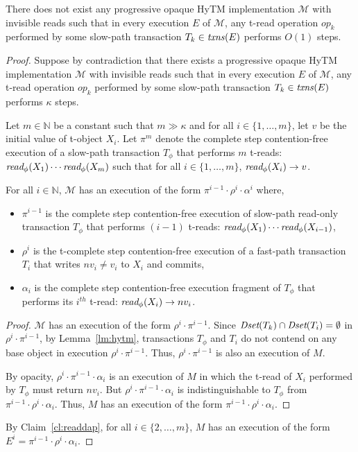 %
\begin{theorem}
\label{th:impossibility}
There does not exist any progressive opaque HyTM implementation $\mathcal{M}$ with invisible reads such that in every execution $E$ of $\mathcal{M}$, any t-read operation $op_k$ performed by some slow-path transaction $T_k \in \ms{txns}(E)$
performs $O(1)$ steps.
\end{theorem}
%
\begin{proof}
Suppose by contradiction that there exists a progressive opaque HyTM implementation $\mathcal{M}$ with invisible reads such that in every execution $E$ of $\mathcal{M}$, any t-read operation $op_k$ performed by some slow-path transaction $T_k \in \ms{txns}(E)$
performs $\kappa$ steps.

Let $m \in \mathbb{N}$ be a constant such that $m \gg \kappa$ and for all $i\in \{1,\ldots , m\}$, let $v$ be the initial value of t-object $X_i$.
Let $\pi^{m}$ denote the complete step contention-free execution of a slow-path transaction
$T_{\phi}$ that performs ${m}$ t-reads: $\textit{read}_{\phi}(X_1)\cdots \textit{read}_{\phi}(X_{m})$
such that for all $i\in \{1,\ldots , m \}$, $\textit{read}_{\phi}(X_i) \rightarrow v$.
%
\begin{claim}
\label{cl:readdap}
For all $i\in \mathbb{N}$, $\mathcal{M}$ has an execution of the form $\pi^{i-1}\cdot \rho^i\cdot \alpha^i$ where,
%
\begin{itemize}
\item
$\pi^{i-1}$ is the complete step contention-free execution of slow-path read-only transaction $T_{\phi}$ that performs
$(i-1)$ t-reads: $\textit{read}_{\phi}(X_1)\cdots \textit{read}_{\phi}(X_{i-1})$,
\item
$\rho^i$ is the t-complete step contention-free execution of a fast-path transaction $T_{i}$
that writes $nv_i\neq v_i$ to $X_i$ and commits,
\item
$\alpha_i$ is the complete step contention-free execution fragment of $T_{\phi}$ that performs its $i^{th}$ t-read:
$\textit{read}_{\phi}(X_i) \rightarrow nv_i$.
\end{itemize}
%
\end{claim}
%
\begin{proof}
%
$\mathcal{M}$ has an execution of the form $\rho^i\cdot \pi^{i-1}$.
Since $\textit{Dset}(T_k) \cap \textit{Dset}(T_{i}) =\emptyset$ in $\rho^i\cdot \pi^{i-1}$,
by Lemma~\ref{lm:hytm}, transactions $T_{\phi}$ and $T_i$ do not contend
on any base object in execution $\rho^i\cdot \pi^{i-1}$.
Thus, $\rho^i\cdot \pi^{i-1}$ is also an execution of $M$.

By opacity, $\rho^i\cdot \pi^{i-1} \cdot \alpha_i$ is an execution
of $M$ in which the t-read of $X_i$ performed by $T_{\phi}$ must return $nv_i$.
But $\rho^i \cdot \pi^{i-1} \cdot \alpha_i$ is indistinguishable to $T_{\phi}$ from
$\pi^{i-1}\cdot \rho^i \cdot \alpha_i$.
Thus, $M$ has an execution of the form $\pi^{i-1}\cdot \rho^i \cdot \alpha_i$.
\end{proof}
%
By Claim~\ref{cl:readdap}, for all $i\in \{2,\ldots, m\}$, $M$ has an execution of the form 
$E^{i}=\pi^{i-1}\cdot \rho^i \cdot \alpha_i$.


\end{proof}
